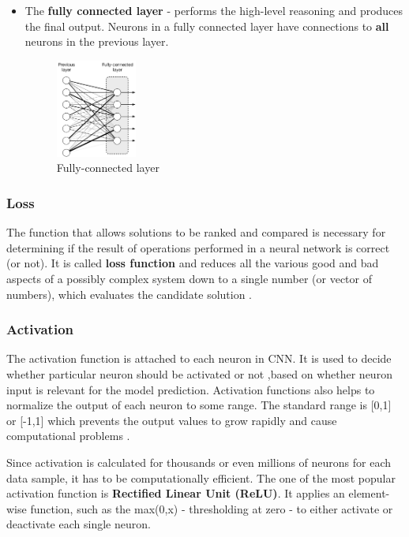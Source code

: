 \documentclass[../Main.tex]{subfiles}
\begin{document}
\begin{itemize}
        \item The  \textbf{fully connected layer} - performs the high-level reasoning and produces the final output. Neurons in a fully connected layer have connections to \textbf{all} neurons in the previous layer.
        \begin{figure}[ht!]
            \centering
            \includegraphics[width=0.25\textwidth]{Images/02_cnn_fully_connected.png}
            \caption{Fully-connected layer \cite{medium-teco}}
            \label{fig:cnn-fully-connected}
        \end{figure}
    \end{itemize}


    \subsubsection{Loss}
    The function that allows solutions to be ranked and compared is necessary for determining if the result of operations performed in a neural network is correct (or not). It is called \textbf{loss function} and reduces all the various good and bad aspects of a possibly complex system down to a single number (or vector of numbers), which evaluates the candidate solution \cite{neuralsmithingbook}. 
    
    \subsubsection{Activation}
    The activation function is attached to each neuron in CNN. It is used to decide whether particular neuron should be activated or not ,based on whether neuron input is relevant for the model prediction. Activation functions also helps to normalize the output of each neuron to some range. The standard range is [0,1] or [-1,1] which prevents the output values to grow rapidly and cause computational problems \cite{missinglink}. 

    Since activation is calculated for thousands or even millions of neurons for each data sample, it has to be computationally efficient. The one of the most popular activation function is \textbf{Rectified Linear Unit (ReLU)}. It applies an element-wise function, such as the max(0,x) - thresholding at zero - to either activate or deactivate each single neuron.
\end{document}
